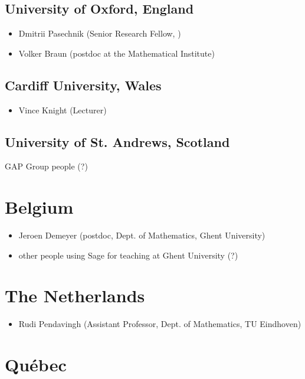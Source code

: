 \subsection*{University of Oxford, England}
\begin{itemize}
\item Dmitrii Pasechnik (Senior Research Fellow, \CS)
\item Volker Braun (postdoc at the Mathematical Institute)
\end{itemize}

\subsection*{Cardiff University, Wales}
\begin{itemize}
\item Vince Knight (Lecturer)
\end{itemize}

\subsection*{University of St. Andrews, Scotland}
GAP Group people (?)

\section*{Belgium}

\begin{itemize}
\item Jeroen Demeyer (postdoc, Dept. of Mathematics, Ghent University)
\item other people using Sage for teaching at Ghent University (?)
\end{itemize}

\section*{The Netherlands}

\begin{itemize}
\item Rudi Pendavingh (Assistant Professor, Dept. of Mathematics, TU Eindhoven)
\end{itemize}

\section*{Québec}

